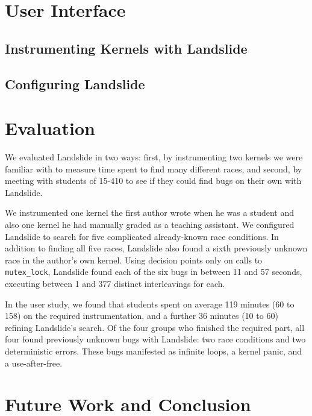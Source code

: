 \documentclass{llncs}
\begin{document}
\section{User Interface}

\subsection{Instrumenting Kernels with Landslide}
\label{sec:instrument}

\subsection{Configuring Landslide}
\label{sec:config}


\section{Evaluation}

We evaluated Landslide in two ways: first, by instrumenting two kernels we were familiar with to measure time spent to find many different races, and second, by meeting with students of 15-410 to see if they could find bugs on their own with Landslide.

We instrumented one kernel the first author wrote when he was a student and also one kernel he had manually graded as a teaching assistant. We configured Landslide to search for five complicated already-known race conditions. In addition to finding all five races, Landslide also found a sixth previously unknown race in the author's own kernel. Using decision points only on calls to \texttt{mutex\_lock}, Landslide found each of the six bugs in between 11 and 57 seconds, executing between 1 and 377 distinct interleavings for each.

In the user study, we found that students spent on average 119 minutes (60 to 158) on the required instrumentation, and a further 36 minutes (10 to 60) refining Landslide's search. Of the four groups who finished the required part, all four found previously unknown bugs with Landslide: two race conditions and two deterministic errors. These bugs manifested as infinite loops, a kernel panic, and a use-after-free.

\section{Future Work and Conclusion}



{}

\end{document}
